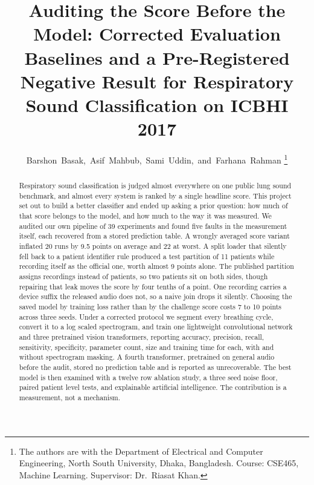 \documentclass[journal,onecolumn]{IEEEtran}
\begin{document}
\title{Auditing the Score Before the Model: Corrected Evaluation
Baselines and a Pre-Registered Negative Result for Respiratory Sound
Classification on ICBHI 2017}

\author{Barshon~Basak,~Asif~Mahbub,~Sami~Uddin,~and~Farhana~Rahman%
\thanks{The authors are with the Department of Electrical and Computer
Engineering, North South University, Dhaka, Bangladesh. Course: CSE465,
Machine Learning. Supervisor: Dr.~Riasat Khan.}}

\maketitle

\begin{abstract}
Respiratory sound classification is judged almost everywhere on one public lung sound
benchmark, and almost every system is ranked by a single headline score. This project set out
to build a better classifier and ended up asking a prior question: how much of that score
belongs to the model, and how much to the way it was measured. We audited our own
pipeline of 39 experiments and found five faults in the measurement itself, each recovered
from a stored prediction table. A wrongly averaged score
variant inflated 20 runs by 9.5 points on average and 22 at worst. A split loader that
silently fell back to a patient identifier rule produced a test partition of 11 patients
while recording itself as the official one, worth almost 9 points alone. The published
partition assigns recordings instead of patients, so two patients sit on both sides, though
repairing that leak moves the score by four tenths of a point. One recording carries a device
suffix the released audio does not, so a naive join drops it silently. Choosing the saved
model by training loss rather than by the challenge score costs 7 to 10 points across three
seeds. Under a corrected protocol we segment every breathing cycle, convert it to a log scaled
spectrogram, and train one lightweight convolutional network and three pretrained vision
transformers, reporting accuracy, precision, recall, sensitivity, specificity, parameter
count, size and training time for each, with and without spectrogram masking.
A fourth transformer, pretrained on general audio before the audit, stored no prediction
table and is reported as unrecoverable. The best model is then examined
with a twelve row ablation study, a three seed noise floor, paired patient level tests, and
explainable artificial intelligence. The contribution is a measurement, not a mechanism.
\end{abstract}
\end{document}
